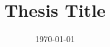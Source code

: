 \documentclass[a4paper, 10pt, oneside]{memoir}
\title				{Thesis Title}
\date				{\today}
\theoremstyle{definition}
\begin{document}

\thesisfront
\maketitle
\pagestyle{thesis}
% 

\thesistoc
\thesismain
\nocite{*} %

\thesisappendix
\thesisbib
\begin{appendices}
	
\end{appendices}
\thesisback
{}
  {}
  {}
\end{document}
